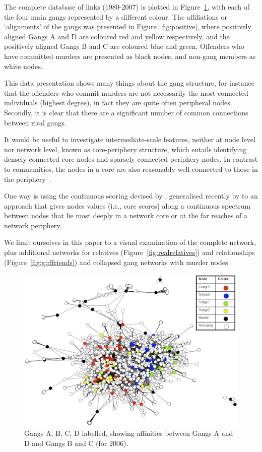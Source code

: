 \documentclass[twocolumn]{svjour3}          %
\theoremstyle{definition}
\begin{document}
The complete database of links (1980-2007) is plotted in
Figure~\ref{fig:legend2006}, with each of the four main gangs
represented by a different colour. The affiliations or `alignments' of
the gangs was presented in Figure~\ref{fig:positive}, where positively
aligned Gangs A and D are coloured red and yellow respectively, and
the positively aligned Gangs B and C are coloured blue and
green. Offenders who have committed murders are presented as black
nodes, and non-gang members as white nodes.

This data presentation shows many things about the gang structure, for
instance that the offenders who commit murders are not necessarily the
most connected individuals (highest degree), in fact they are quite
often peripheral nodes. Secondly, it is clear that there are a
significant number of common connections between rival gangs.

It would be useful to investigate intermediate-scale features, neither
at node level nor network level, known as core-periphery structure,
which entails identifying densely-connected core nodes and
sparsely-connected periphery nodes. In contrast to communities, the
nodes in a core are also reasonably well-connected to those in the
periphery~\citep{rombach-et-al:2014}.

One way is using the continuous scoring devised by
\citet{borgatti+everett:2000}, generalised recently by
\citet{rombach-et-al:2014} to an approach that gives nodes values
(i.e., core scores) along a continuous spectrum between nodes that lie
most deeply in a network core or at the far reaches of a network
periphery.

We limit ourselves in this paper to a visual examination of the
complete network, plus additional networks for relatives
(Figure~\ref{fig:realrelatives}) and relationships
(Figure~\ref{fig:girlfriends}) and collapsed gang networks with murder
nodes.


\begin{figure}[!ht]
\centering
\includegraphics[width=\columnwidth]{images/legend2006}
\caption{Gangs A, B, C, D labelled, showing affinities between Gangs A
  and D and Gangs B and C (for 2006).}
\label{fig:legend2006} 
\end{figure}
\end{document}
